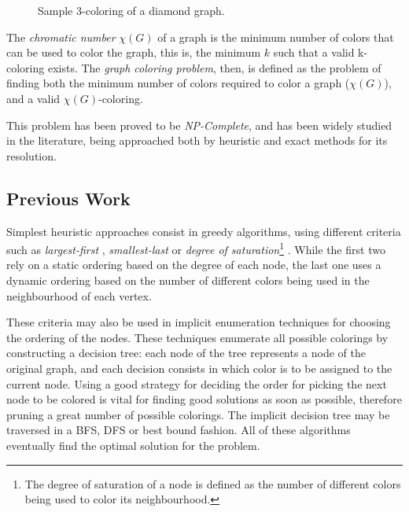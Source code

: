 \begin{figure}[h]
	\centering
\caption{Sample 3-coloring of a diamond graph.}
	\label{fig:samplecoloring}
\end{figure}

The \textit{chromatic number} $\chi(G)$ of a graph is the minimum number of colors that can be used to color the graph, this is, the minimum $k$ such that a valid k-coloring exists. The \textit{graph coloring problem}, then, is defined as the problem of finding both the minimum number of colors required to color a graph ($\chi(G)$), and a valid $\chi(G)$-coloring.

This problem has been proved to be \textit{NP-Complete}, and has been widely studied in the literature, being approached both by heuristic and exact methods for its resolution.

\subsection*{Previous Work}

Simplest heuristic approaches consist in greedy algorithms, using different criteria such as \textit{largest-first} \cite{welsh1967upper}, \textit{smallest-last} \cite{matula1972graph} or \textit{degree of saturation}\footnote{The degree of saturation of a node is defined as the number of different colors being used to color its neighbourhood.} \cite{brelaz1979new}. While the first two rely on a static ordering based on the degree of each node, the last one uses a dynamic ordering based on the number of different colors being used in the neighbourhood of each vertex.

These criteria may also be used in implicit enumeration techniques for choosing the ordering of the nodes. These techniques enumerate all possible colorings by constructing a decision tree: each node of the tree represents a node of the original graph, and each decision consists in which color is to be assigned to the current node. Using a good strategy for deciding the order for picking the next node to be colored is vital for finding good solutions as soon as possible, therefore pruning a great number of possible colorings. The implicit decision tree may be traversed in a BFS, DFS or best bound fashion. All of these algorithms eventually find the optimal solution for the problem.

